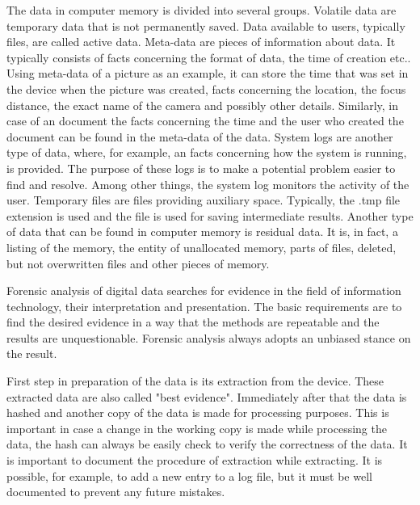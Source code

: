 The data in computer memory is divided into several groups. Volatile data are temporary data that is not permanently saved. Data available to users, typically files, are called active data. Meta-data are pieces of information about data. It typically consists of facts concerning the format of data, the time of creation etc.. Using meta-data of a picture as an example, it can store the time that was set in the device when the picture was created, facts concerning the location, the focus distance, the exact name of the camera and possibly other details. Similarly, in case of an document the facts concerning the time and the user who created the document can be found in the meta-data of the data. System logs are another type of data, where, for example, an facts concerning how the system is running, is provided. The purpose of these logs is to make a potential problem easier to find and resolve. Among other things, the system log monitors the activity of the user. Temporary files are files providing auxiliary space. Typically, the .tmp file extension is used and the file is used for saving intermediate results. Another type of data that can be found in computer memory is residual data. It is, in fact, a listing of the memory, the entity of unallocated memory, parts of files, deleted, but not overwritten files and other pieces of memory.


Forensic analysis of digital data searches for evidence in the field of information technology, their interpretation and presentation. The basic requirements are to find the desired evidence in a way that the methods are repeatable and the results are unquestionable. Forensic analysis always adopts an unbiased stance on the result.

First step in preparation of the data is its extraction from the device. These extracted data are also called "best evidence". Immediately after that the data is hashed and another copy of the data is made for processing purposes. This is important in case a change in the working copy is made while processing the data, the hash can always be easily check to verify the correctness of the data. It is important to document the procedure of extraction while extracting. It is possible, for example, to add a new entry to a log file, but it must be well documented to prevent any future mistakes.


%
%
%
%
%
%
% 	

